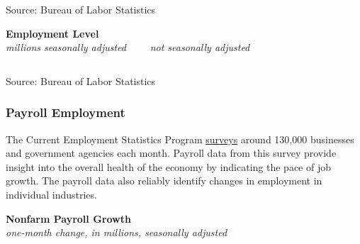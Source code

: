 \documentclass{report}
\newcommand{\tbllink}[1]{\href{https://raw.githubusercontent.com/bdecon/US-chartbook/master/chartbook/data/#1}{\faTable}}
\begin{document}
{\begin{minipage}{0.35\textwidth}
\end{minipage}

\begin{minipage}{1.0\textwidth}
\footnotesize{Source: Bureau of Labor Statistics} \hfill \tbllink{emp_ts.csv}
\vspace{1mm}

\small 
\vspace{2mm}

\normalsize \textbf{Employment Level}\\
\footnotesize{\textit{millions \hspace{26mm} seasonally adjusted \ \ \ \ not seasonally adjusted}}

\vspace*{-3mm}
\hspace*{-2mm} \noindent {} \setlength{\tabcolsep}{5.2pt} \color{black!90}
		{\renewcommand{\arraystretch}{1.62}
		 \begin{tabular}{p{33.5mm} R{8mm} R{8mm} | R{8mm} R{8mm} R{8mm} R{8mm} R{8mm}}
		 \hline
		\end{tabular}}	

\vspace{-1mm}	
\footnotesize{Source: Bureau of Labor Statistics}
\end{minipage}
\newpage
\vspace*{-11mm} \hypertarget{nfplt}{}

\begin{minipage}{1.0\textwidth}  
\subsubsection*{Payroll Employment}
\small The Current Employment Statistics Program \href{https://www.bls.gov/ces/}{surveys} around 130,000 businesses and government agencies each month. Payroll data from this survey provide insight into the overall health of the economy by indicating the pace of job growth. The payroll data also reliably identify changes in employment in individual industries. 
\end{minipage}

\begin{minipage}{0.285\textwidth}
\small 
\end{minipage} \hspace{5mm}
\begin{minipage}{0.44\textwidth}
\normalsize \textbf{Nonfarm Payroll Growth}\\
\footnotesize{\textit{one-month change, in millions, seasonally adjusted}}
\vspace{7.0cm}


\end{minipage}}
\end{document}
